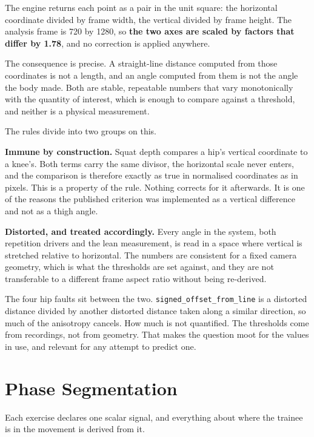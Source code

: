 The engine returns each point as a pair in the unit square: the horizontal coordinate divided by frame width, the vertical divided by frame height. The analysis frame is 720 by 1280, so \textbf{the two axes are scaled by factors that differ by 1.78}, and no correction is applied anywhere.

The consequence is precise. A straight-line distance computed from those coordinates is not a length, and an angle computed from them is not the angle the body made. Both are stable, repeatable numbers that vary monotonically with the quantity of interest, which is enough to compare against a threshold, and neither is a physical measurement.

The rules divide into two groups on this.

\textbf{Immune by construction.} Squat depth compares a hip's vertical coordinate to a knee's. Both terms carry the same divisor, the horizontal scale never enters, and the comparison is therefore exactly as true in normalised coordinates as in pixels. This is a property of the rule. Nothing corrects for it afterwards. It is one of the reasons the published criterion was implemented as a vertical difference and not as a thigh angle.

\textbf{Distorted, and treated accordingly.} Every angle in the system, both repetition drivers and the lean measurement, is read in a space where vertical is stretched relative to horizontal. The numbers are consistent for a fixed camera geometry, which is what the thresholds are set against, and they are not transferable to a different frame aspect ratio without being re-derived.

The four hip faults sit between the two. \texttt{signed\_\allowbreak{}offset\_\allowbreak{}from\_\allowbreak{}line} is a distorted distance divided by another distorted distance taken along a similar direction, so much of the anisotropy cancels. How much is not quantified. The thresholds come from recordings, not from geometry. That makes the question moot for the values in use, and relevant for any attempt to predict one.

\section{Phase Segmentation}
\label{sec:6.3}

Each exercise declares one scalar signal, and everything about where the trainee is in the movement is derived from it.


